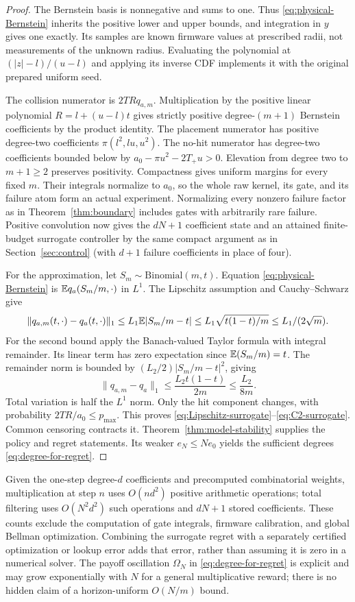 \begin{proof}
The Bernstein basis is nonnegative and sums to one. Thus
\eqref{eq:physical-Bernstein} inherits the positive lower and upper bounds,
and integration in $y$ gives one exactly. Its samples are known firmware
values at prescribed radii, not measurements of the unknown radius.
Evaluating the polynomial at $(|z|-l)/(u-l)$ and applying its inverse CDF
implements it with the original prepared uniform seed.

The collision numerator is $2TR q_{a,m}$. Multiplication by the positive
linear polynomial $R=l+(u-l)t$ gives strictly positive degree-$(m+1)$
Bernstein coefficients by the product identity. The placement numerator
has positive degree-two coefficients $\pi(l^2,lu,u^2)$. The no-hit
numerator has degree-two coefficients bounded below by
$a_0-\pi u^2-2T_+u>0$. Elevation from degree two to $m+1\ge2$ preserves
positivity. Compactness gives uniform margins for every fixed $m$.
Their integrals normalize to $a_0$, so the whole raw kernel, its gate,
and its failure atom form an actual experiment. Normalizing every nonzero
failure factor as in Theorem~\ref{thm:boundary} includes gates with arbitrarily
rare failure. Positive convolution now gives the $dN+1$ coefficient state
and an attained finite-budget surrogate controller by the same compact
argument as in Section~\ref{sec:control} (with $d+1$ failure coefficients
in place of four).

For the approximation, let $S_m\sim\mathrm{Binomial}(m,t)$. Equation
\eqref{eq:physical-Bernstein} is $\mathbb E q_a(S_m/m,\cdot)$ in $L^1$.
The Lipschitz assumption and Cauchy--Schwarz give
\[
 \|q_{a,m}(t,\cdot)-q_a(t,\cdot)\|_1
 \le L_1\mathbb E|S_m/m-t|
 \le L_1\sqrt{t(1-t)/m}\le L_1/(2\sqrt m).
\]
For the second bound apply the Banach-valued Taylor formula with integral
remainder. Its linear term has zero expectation since $\mathbb E(S_m/m)=t$.
The remainder norm is bounded by $(L_2/2)|S_m/m-t|^2$, giving
\[
 \|q_{a,m}-q_a\|_1\le\frac{L_2 t(1-t)}{2m}\le\frac{L_2}{8m}.
\]
Total variation is half the $L^1$ norm. Only the hit component changes,
with probability $2TR/a_0\le p_{\max}$. This proves
\eqref{eq:Lipschitz-surrogate}--\eqref{eq:C2-surrogate}. Common censoring
contracts it. Theorem~\ref{thm:model-stability} supplies the policy and
regret statements. Its weaker $e_N\le Ne_0$ yields the sufficient degrees
\eqref{eq:degree-for-regret}.
\end{proof}

Given the one-step degree-$d$ coefficients and precomputed combinatorial
weights, multiplication at step $n$ uses $O(nd^2)$ positive arithmetic
operations; total filtering uses $O(N^2d^2)$ such operations and $dN+1$
stored coefficients. These counts exclude the computation of gate integrals,
firmware calibration, and global Bellman optimization. Combining the
surrogate regret with a separately certified optimization or lookup error
adds that error, rather than assuming it is zero in a numerical solver.
The payoff oscillation $\Omega_N$ in \eqref{eq:degree-for-regret} is explicit
and may grow exponentially with $N$ for a general multiplicative reward;
there is no hidden claim of a horizon-uniform $O(N/m)$ bound.

